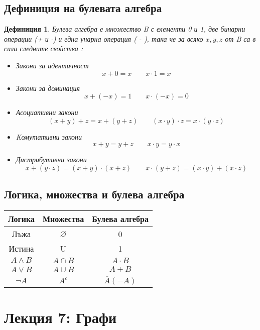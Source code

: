 \documentclass[fleqn, 12pt]{article}
\newtheorem{definition}{Дефиниция}[subsection]
\theoremstyle{definition}
\begin{document}
\subsection{Дефиниция на булевата алгебра}
\begin{definition}
Булева алгебра е множество B с елементи 0 и 1, две бинарни операции (+ и $\cdot$) и една унарна операция ( - ), така че за всяко $x, y, z$ от B са в сила следните свойства :
\begin{itemize}
\item Закони за идентичност
$$x + 0 = x \qquad x \cdot 1 = x$$
\item Закони за доминация
$$ x+(-x) = 1 \qquad x \cdot (-x) = 0$$
\item Асоциативни закони
$$(x+y)+z  = x +(y+z) \qquad (x \cdot y) \cdot z = x \cdot ( y \cdot z) $$
\item Kомутативни закони
$$x+y = y+z \qquad x \cdot y = y \cdot x$$
\item Дистрибутивни закони
$$x+(y \cdot z) = (x+y) \cdot (x+z) \qquad  x\cdot(y + z) = (x\cdot y) + (x\cdot z)$$
\end{itemize}
\end{definition}

\subsection{Логика, множества и булева алгебра}
\begin{table}[h!]
  \begin{center}
    \begin{tabular}{|c|c|c|} 
\hline
      \textbf{Логика} &  \textbf{Множества} &  \textbf{Булева алгебра}\\
\hline
	Лъжа & $\varnothing$ & 0\\ 
\hline
	Истина & U & 1\\
\hline
	$A \land B$ & $A \cap B$ & $A \cdot B$ \\ 
\hline
	$A \lor B$ & $A \cup B$ & $A + B$\\
\hline
	$\neg A$ & $A^c$ & $\overline{A} (-A)$ \\  
\hline
    \end{tabular}
  \end{center}
\end{table}

\newpage

\section{Лекция 7: Графи}
\end{document}
